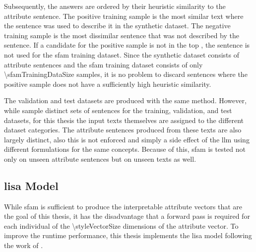 Subsequently, the answers are ordered by their heuristic similarity to the attribute sentence. The positive training sample is the most similar text where the sentence was used to describe it in the synthetic dataset. The negative training sample is the most dissimilar sentence that was not described by the sentence. If a candidate for the positive sample is not in the top \sfamDataTopPercentText{}, the sentence is not used for the \ac{sfam} training dataset. %
Since the synthetic dataset consists of \numStyleSentencesText{} attribute sentences and the \ac{sfam} training dataset consists of only \num{\sfamTrainingDataSize} samples, it is no problem to discard sentences where the positive sample does not have a sufficiently high heuristic similarity.

The validation and test datasets are produced with the same method. However, while \citet{patelLearningInterpretableStyle2023} sample distinct sets of sentences for the training, validation, and test datasets, for this thesis the input texts themselves are assigned to the different dataset categories. The attribute sentences produced from these texts are also largely distinct, also this is not enforced and simply a side effect of the \ac{llm} using different formulations for the same concepts. %
Because of this, \ac{sfam} is tested not only on unseen attribute sentences but on unseen texts as well.

%     


\subsection{\acf{lisa} Model}
\label{sec:experiments:setup:lisa}
While \ac{sfam} is sufficient to produce the interpretable attribute vectors that are the goal of this thesis, it has the disadvantage that a forward pass is required for each individual of the \num{\styleVectorSize} dimensions of the attribute vector. To improve the runtime performance, this thesis implements the \ac{lisa} model following the work of \citet{patelLearningInterpretableStyle2023}.

